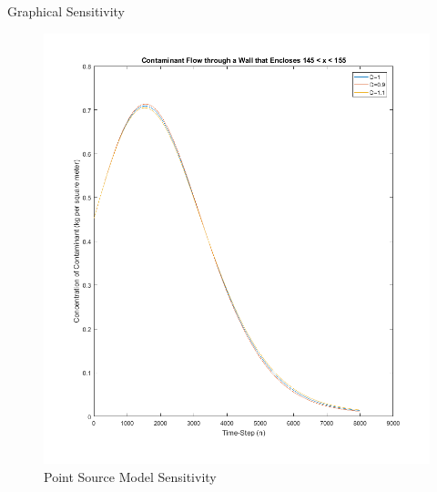 \documentclass[10pt]{beamer}
\begin{document}
\begin{frame}{Graphical Sensitivity} \label{Graphical Sensitivity}

\begin{figure}   
\begin{minipage}[b]{0.4\textwidth}
   \includegraphics[trim=0mm 0mm 0mm 0mm,clip,width=1\linewidth]{sensepoint.png}
\begin{center}
\caption{Point Source Model Sensitivity}
\end{center}
\end{minipage}
 \begin{minipage}[b]{0.4\textwidth}

\end{minipage}
\end{figure}
\end{frame}
\end{document}

